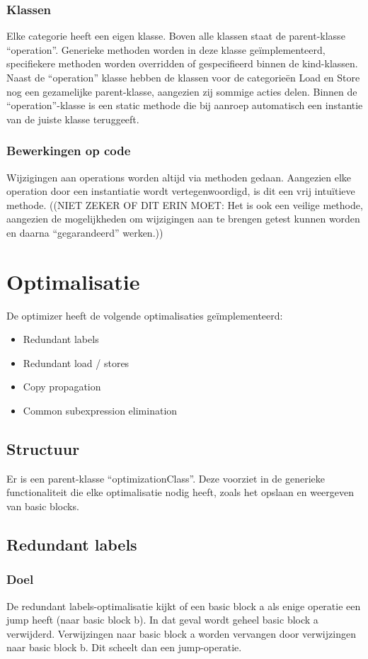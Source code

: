 \documentclass[a4paper,10pt]{article}
\begin{document}
\subsubsection{Klassen}
Elke categorie heeft een eigen klasse. Boven alle klassen staat de
parent-klasse ``operation''. Generieke methoden worden in deze klasse
ge\"implementeerd, specifiekere methoden worden overridden of gespecifieerd
binnen de kind-klassen. Naast de ``operation'' klasse hebben de klassen voor de
categorie\"en Load en Store nog een gezamelijke parent-klasse, aangezien zij
sommige acties delen. Binnen de ``operation''-klasse is een static methode die
bij aanroep automatisch een instantie van de juiste klasse teruggeeft.

\subsubsection{Bewerkingen op code}
Wijzigingen aan operations worden altijd via methoden gedaan. Aangezien elke
operation door een instantiatie wordt vertegenwoordigd, is dit een vrij
intu\"itieve methode. ((NIET ZEKER OF DIT ERIN MOET: Het is ook een veilige
methode, aangezien de mogelijkheden om wijzigingen aan te brengen getest kunnen
worden en daarna ``gegarandeerd'' werken.))

\section{Optimalisatie}
De optimizer heeft de volgende optimalisaties ge\"implementeerd:
\begin{itemize}
\item Redundant labels
\item Redundant load / stores
\item Copy propagation
\item Common subexpression elimination
\end{itemize}

\subsection{Structuur}
Er is een parent-klasse ``optimizationClass''. Deze voorziet in de generieke
functionaliteit die elke optimalisatie nodig heeft, zoals het opslaan en
weergeven van basic blocks. 

\subsection{Redundant labels}
\subsubsection{Doel}
De redundant labels-optimalisatie kijkt of een basic block a als enige
operatie een jump heeft (naar basic block b). In dat geval wordt geheel basic
block a verwijderd. Verwijzingen naar basic block a worden vervangen door
verwijzingen naar basic block b. Dit scheelt dan een jump-operatie.
\end{document}

